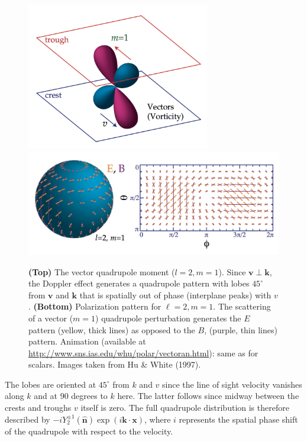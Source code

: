 \documentclass[a4paper,10pt]{article}
\begin{document}
\begin{figure}[t!]
\centering
\includegraphics[width=8cm]{figures/VectorQuadrupole.png}
\includegraphics[width=15cm]{figures/VectorPattern.png}
\caption{\footnotesize{\textbf{(Top)} The vector quadrupole moment ($l=2,m=1$). Since $\bm{v}\perp\bm{k}$, the Doppler effect generates a quadrupole pattern with lobes $45^\circ$ from $\bm{v}$ and $\bm{k}$ that is spatially out of phase (interplane peaks) with $v$. \textbf{(Bottom)} Polarization pattern for $\ell=2,m=1$. The scattering of a vector ($m=1$) quadrupole perturbation generates the $E$ pattern (yellow, thick lines) as opposed to the $B$, (purple, thin lines) pattern. Animation (available at \href{http://www.sns.ias.edu/whu/polar/vectoran.html}{http://www.sns.ias.edu/whu/polar/vectoran.html}): same as for scalars. Images taken from Hu \& White (1997).}}
    \label{fig:vector}
\end{figure}

{\noindent}The lobes are oriented at $45^\circ$ from $k$ and $v$ since the line
of sight velocity vanishes along $k$ and at $90$ degrees to $k$ here. The latter follows since midway between the crests and troughs $v$ itself is zero. The full quadrupole distribution is therefore described by $-iY_2^{\pm1}(\bm{\hat{n}})\exp(i\bm{k}\cdot\bm{x})$, where $i$ represents the spatial phase shift of the quadrupole with respect to the velocity.
\end{document}
